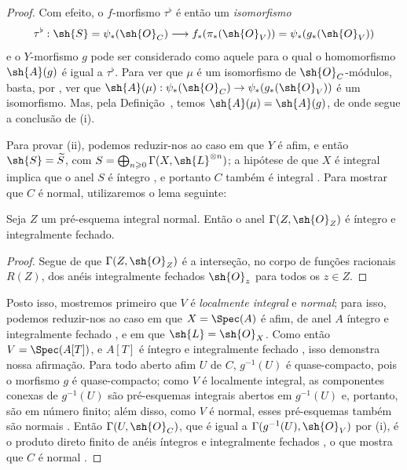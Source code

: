 \documentclass[oneside,10pt]{amsart}
\makeatletter
\renewcommand{\geq}{\geqslant}
\newcommand{\ega@arrow}[2]{\mathchoice{#1}{#2}{#2}{#2}}
\renewcommand{\to}{\ega@arrow{\longrightarrow}{\rightarrow}}
\newcommand{\oldpage}[2][]{\marginnote{\normalfont\footnotesize\textbf{#1}~|~#2}\ignorespaces}
\let\EGAOriginalLabel\label
\renewcommand{\label}[1]{\phantomsection\EGAOriginalLabel{#1}}
\makeatother
\begin{document}
\begin{proof}
Com efeito, o $f$-morfismo $\tau^\flat$ é então um \emph{isomorfismo}
\[
  \tau^\flat:\sh{S}=\psi_*(\sh{O}_C)\to f_*(\pi_*(\sh{O}_V))=\psi_*(g_*(\sh{O}_V))
\]
e o $Y$-morfismo $g$ pode ser considerado como aquele para o qual o homomorfismo $\sh{A}(g)$  é igual a $\tau^\flat$.
Para ver que $\mu$ é um isomorfismo de $\sh{O}_C$-módulos, basta, por , ver que $\sh{A}(\mu):\psi_*(\sh{O}_C)\to\psi_*(g_*(\sh{O}_V))$ é um isomorfismo.
Mas, pela Definição~, temos $\sh{A}(\mu)=\sh{A}(g)$, de onde segue a conclusão de (i).

Para provar (ii), podemos reduzir-nos ao caso em que $Y$ é afim, e então $\sh{S}=\widetilde{S}$, com
\oldpage[II]{182}
$S=\bigoplus_{n\geq0}\Gamma(X,\sh{L}^{\otimes n})$;
a hipótese de que $X$ é integral implica que o anel $S$ é íntegro , e portanto $C$ também é integral .
Para mostrar que $C$ é normal, utilizaremos o lema seguinte:

\begin{lemma}[8.8.6.1]
\label{II.8.8.6.1}
Seja $Z$ um pré-esquema integral normal.
Então o anel $\Gamma(Z,\sh{O}_Z)$ é íntegro e integralmente fechado.
\end{lemma}

\begin{proof}
Segue de  que $\Gamma(Z,\sh{O}_Z)$ é a interseção, no corpo de funções racionais $R(Z)$, dos anéis integralmente fechados $\sh{O}_z$ para todos os $z\in Z$.
\end{proof}

Posto isso, mostremos primeiro que $V$ é \emph{localmente integral} e \emph{normal};
para isso, podemos reduzir-nos ao caso em que $X=\Spec(A)$ é afim, de anel $A$ íntegro e integralmente fechado , e em que $\sh{L}=\sh{O}_X$.
Como então $V=\Spec(A[T])$, e $A[T]$ é íntegro e integralmente fechado \cite[p.~99]{II-24}, isso demonstra nossa afirmação.
Para todo aberto afim $U$ de $C$, $g^{-1}(U)$ é quase-compacto, pois o morfismo $g$ é quase-compacto;
como $V$ é localmente integral, as componentes conexas de $g^{-1}(U)$ são pré-esquemas integrais abertos em $g^{-1}(U)$ e, portanto, são em número finito; além disso, como $V$ é normal, esses pré-esquemas também são normais .
Então $\Gamma(U,\sh{O}_C)$, que é igual a $\Gamma(g^{-1}(U),\sh{O}_V)$ por (i), é o produto direto finito de anéis íntegros e integralmente fechados , o que mostra que $C$ é normal .
\end{proof}
\end{document}
